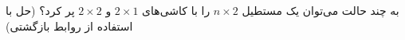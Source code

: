 \EXERCISE
به چند حالت می‌توان یک مستطیل
$n\times2$
را با کاشی‌های
$2\times1$
و
$2\times2$
پر کرد؟ (حل با استفاده از روابط بازگشتی)